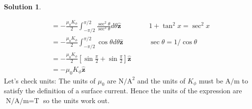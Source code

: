 \documentclass[10pt]{article}
\theoremstyle{definition}
\newtheorem{soln}{Solution}
\newcommand{\uz}{\hat{\mathbf{z}}}
\newcommand{\justif}[2]{&{#1}&\text{#2}}
\begin{document}
\begin{soln}
\begin{enumerate}[label=(\alph*)]
\begin{align*}
             & =-\frac{\mu_0K_\phi}{2}\int_{-\pi/2}^{\pi/2}\frac{\sec^2\theta}{\sec^3\theta}d\theta\uz\justif{\quad}{$1+\tan^2 x=\sec^2 x$} \\
             & =-\frac{\mu_0K_\phi}{2}\int_{-\pi/2}^{\pi/2}\cos\theta d\theta\uz\justif{\quad}{$\sec\theta=1/\cos\theta$}                   \\
             & =-\frac{\mu_0K_\phi}{2}\left[\sin\frac{\pi}{2}+\sin\frac{\pi}{2}\right]\uz                                                   \\
             & =-\mu_0K_\phi\uz
          \end{align*}
          Let's check units: The units of $\mu_0$ are $\unit{\newton\per\ampere\squared}$ and the units of $K_\phi$ must be $\unit{\ampere\per\meter}$ to satisfy the
          definition of a surface current. Hence the units of the expression are $\unit{\newton\per\ampere\per\meter}=\unit{\tesla}$ so the units work out.
  \end{enumerate}
\end{soln}
\end{document}
